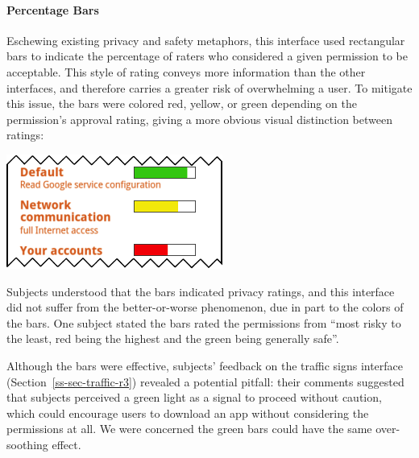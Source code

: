 \documentclass[11pt]{article}
\newcommand{\refsec}[1]{Section~\ref{#1}}
\begin{document}
\paragraph{Percentage Bars}
\label{s-sec-pbars}

Eschewing existing privacy and safety metaphors,
this interface used rectangular bars to indicate 
the percentage of raters who considered a given permission to be acceptable.
This style of rating conveys more information than the other
interfaces, and therefore carries a greater risk of overwhelming a user. To mitigate this 
issue, the bars were colored red, yellow, or green depending on the permission's approval 
rating, giving a more obvious visual distinction between ratings:
\label{ss-sec-pbars-r1}
\begin{center}
\includegraphics[width=.5\linewidth]{candidate-img/bars/barsR1.png}
\end{center}
Subjects understood that the bars indicated privacy ratings, 
and this interface did not suffer from the better-or-worse
phenomenon, due in part to the colors of the bars. 
One subject stated the bars rated the permissions from ``most risky to the least, 
red being the highest and the green being generally safe''.

Although the bars were effective, subjects' feedback on 
the traffic signs interface (\refsec{ss-sec-traffic-r3}) 
revealed a potential pitfall: their comments suggested that subjects 
perceived a green light as a signal to proceed without caution, which could 
encourage users to download an app without considering the permissions at all. We were concerned the green bars 
could have the same over-soothing effect.
\end{document}
